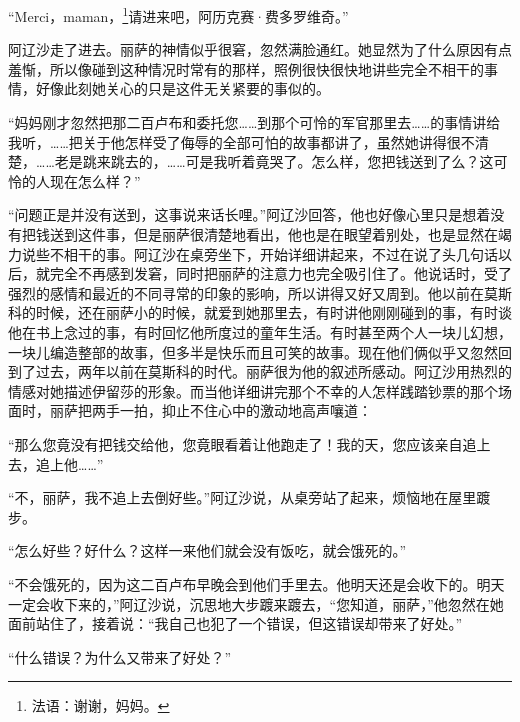 \par “Merci，maman，\footnote{法语：谢谢，妈妈。}请进来吧，阿历克赛·费多罗维奇。”
\par 阿辽沙走了进去。丽萨的神情似乎很窘，忽然满脸通红。她显然为了什么原因有点羞惭，所以像碰到这种情况时常有的那样，照例很快很快地讲些完全不相干的事情，好像此刻她关心的只是这件无关紧要的事似的。
\par “妈妈刚才忽然把那二百卢布和委托您……到那个可怜的军官那里去……的事情讲给我听，……把关于他怎样受了侮辱的全部可怕的故事都讲了，虽然她讲得很不清楚，……老是跳来跳去的，……可是我听着竟哭了。怎么样，您把钱送到了么？这可怜的人现在怎么样？”
\par “问题正是并没有送到，这事说来话长哩。”阿辽沙回答，他也好像心里只是想着没有把钱送到这件事，但是丽萨很清楚地看出，他也是在眼望着别处，也是显然在竭力说些不相干的事。阿辽沙在桌旁坐下，开始详细讲起来，不过在说了头几句话以后，就完全不再感到发窘，同时把丽萨的注意力也完全吸引住了。他说话时，受了强烈的感情和最近的不同寻常的印象的影响，所以讲得又好又周到。他以前在莫斯科的时候，还在丽萨小的时候，就爱到她那里去，有时讲他刚刚碰到的事，有时谈他在书上念过的事，有时回忆他所度过的童年生活。有时甚至两个人一块儿幻想，一块儿编造整部的故事，但多半是快乐而且可笑的故事。现在他们俩似乎又忽然回到了过去，两年以前在莫斯科的时代。丽萨很为他的叙述所感动。阿辽沙用热烈的情感对她描述伊留莎的形象。而当他详细讲完那个不幸的人怎样践踏钞票的那个场面时，丽萨把两手一拍，抑止不住心中的激动地高声嚷道：
\par “那么您竟没有把钱交给他，您竟眼看着让他跑走了！我的天，您应该亲自追上去，追上他……”
\par “不，丽萨，我不追上去倒好些。”阿辽沙说，从桌旁站了起来，烦恼地在屋里踱步。
\par “怎么好些？好什么？这样一来他们就会没有饭吃，就会饿死的。”
\par “不会饿死的，因为这二百卢布早晚会到他们手里去。他明天还是会收下的。明天一定会收下来的，”阿辽沙说，沉思地大步踱来踱去，“您知道，丽萨，”他忽然在她面前站住了，接着说：“我自己也犯了一个错误，但这错误却带来了好处。”
\par “什么错误？为什么又带来了好处？”
